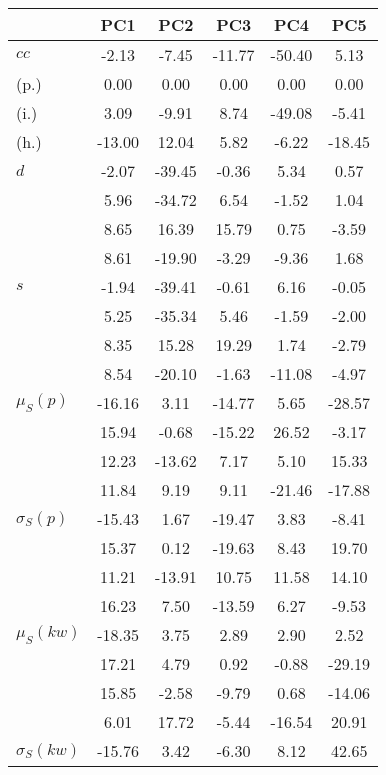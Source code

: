 \begin{table}[h!]
\begin{center}
\begin{tabular}{| l | c | c | c | c | c |}\hline
 & PC1 & PC2 & PC3 & PC4 & PC5 \\\hline
$cc$ & -2.13  & -7.45  & -11.77  & -50.40  & 5.13 \\\hline
(p.) & 0.00  & 0.00  & 0.00  & 0.00  & 0.00 \\\hline
(i.) & 3.09  & -9.91  & 8.74  & -49.08  & -5.41 \\\hline
(h.) & -13.00  & 12.04  & 5.82  & -6.22  & -18.45 \\\hline
$d$ & -2.07  & -39.45  & -0.36  & 5.34  & 0.57 \\\hline
 & 5.96  & -34.72  & 6.54  & -1.52  & 1.04 \\\hline
 & 8.65  & 16.39  & 15.79  & 0.75  & -3.59 \\\hline
 & 8.61  & -19.90  & -3.29  & -9.36  & 1.68 \\\hline
$s$ & -1.94  & -39.41  & -0.61  & 6.16  & -0.05 \\\hline
 & 5.25  & -35.34  & 5.46  & -1.59  & -2.00 \\\hline
 & 8.35  & 15.28  & 19.29  & 1.74  & -2.79 \\\hline
 & 8.54  & -20.10  & -1.63  & -11.08  & -4.97 \\\hline
$\mu_S(p)$ & -16.16  & 3.11  & -14.77  & 5.65  & -28.57 \\\hline
 & 15.94  & -0.68  & -15.22  & 26.52  & -3.17 \\\hline
 & 12.23  & -13.62  & 7.17  & 5.10  & 15.33 \\\hline
 & 11.84  & 9.19  & 9.11  & -21.46  & -17.88 \\\hline
$\sigma_S(p)$ & -15.43  & 1.67  & -19.47  & 3.83  & -8.41 \\\hline
 & 15.37  & 0.12  & -19.63  & 8.43  & 19.70 \\\hline
 & 11.21  & -13.91  & 10.75  & 11.58  & 14.10 \\\hline
 & 16.23  & 7.50  & -13.59  & 6.27  & -9.53 \\\hline
$\mu_S(kw)$ & -18.35  & 3.75  & 2.89  & 2.90  & 2.52 \\\hline
 & 17.21  & 4.79  & 0.92  & -0.88  & -29.19 \\\hline
 & 15.85  & -2.58  & -9.79  & 0.68  & -14.06 \\\hline
 & 6.01  & 17.72  & -5.44  & -16.54  & 20.91 \\\hline
$\sigma_S(kw)$ & -15.76  & 3.42  & -6.30  & 8.12  & 42.65 \\\hline

\end{tabular}
\end{center}
\end{table}
